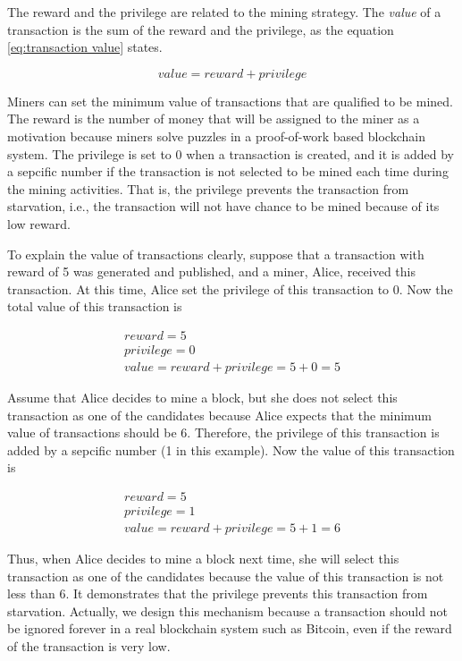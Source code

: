 The reward and the privilege are related to the mining strategy. The \textit{value} of a transaction is the sum of the reward and the privilege, as the equation \ref{eq:transaction value} states.

\begin{equation} \label{eq:transaction value}
    value = reward + privilege
\end{equation}

Miners can set the minimum value of transactions that are qualified to be mined. The reward is the number of money that will be assigned to the miner as a motivation because miners solve puzzles in a proof-of-work based blockchain system. The privilege is set to 0 when a transaction is created, and it is added by a sepcific number if the transaction is not selected to be mined each time during the mining activities. That is, the privilege prevents the transaction from starvation, i.e., the transaction will not have chance to be mined because of its low reward.

To explain the value of transactions clearly, suppose that a transaction with reward of 5 was generated and published, and a miner, Alice, received this transaction. At this time, Alice set the privilege of this transaction to 0. Now the total value of this transaction is 

\begin{gather*}
    reward = 5 \\
    privilege = 0 \\
    value = reward + privilege = 5 + 0 = 5
\end{gather*}

Assume that Alice decides to mine a block, but she does not select this transaction as one of the candidates because Alice expects that the minimum value of transactions should be 6. Therefore, the privilege of this transaction is added by a sepcific number (1 in this example). Now the value of this transaction is

\begin{gather*}
    reward = 5 \\
    privilege = 1 \\
    value = reward + privilege = 5 + 1 = 6
\end{gather*}

Thus, when Alice decides to mine a block next time, she will select this transaction as one of the candidates because the value of this transaction is not less than 6. It demonstrates that the privilege prevents this transaction from starvation. Actually, we design this mechanism because a transaction should not be ignored forever in a real blockchain system such as Bitcoin, even if the reward of the transaction is very low.

